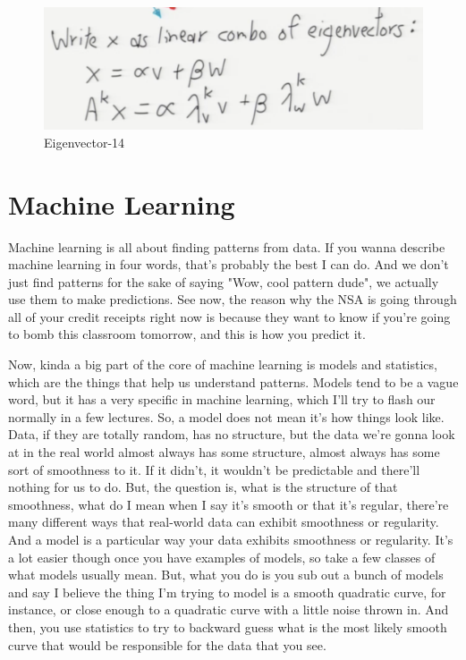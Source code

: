 \documentclass[fleqn,10pt]{olplainarticle}
\theoremstyle{definition}
\theoremstyle{remark}
\begin{document}
\begin{figure}[ht]
\centering
\includegraphics[width=1.0\linewidth]{images/chpt08-14}
\caption{Eigenvector-14}
\label{fig:chpt08-14}
\end{figure}



\clearpage
\section*{Machine Learning}
Machine learning is all about finding patterns from data. If you wanna describe machine learning in four words, that's probably the best I can do. And we don't just find patterns for the sake of saying "Wow, cool pattern dude", we actually use them to make predictions. See now, the reason why the NSA is going through all of your credit receipts right now is because they want to know if you're going to bomb this classroom tomorrow, and this is how you predict it. 

Now, kinda a big part of the core of machine learning is models and statistics, which are the things that help us understand patterns. Models tend to be a vague word, but it has a very specific in machine learning, which I'll try to flash our normally in a few lectures. So, a model does not mean it's how things look like. Data, if they are totally random, has no structure, but the data we're gonna look at in the real world almost always has some structure, almost always has some sort of smoothness to it. If it didn't, it wouldn't be predictable and there'll nothing for us to do. But, the question is, what is the structure of that smoothness, what do I mean when I say it's smooth or that it's regular, there're many different ways that real-world data can exhibit smoothness or regularity. And a model is a particular way your data exhibits smoothness or regularity. It's a lot easier though once you have examples of models, so take a few classes of what models usually mean. But, what you do is you sub out a bunch of models and say I believe the thing I'm trying to model is a smooth quadratic curve, for instance, or close enough to a quadratic curve with a little noise thrown in. And then, you use statistics to try to backward guess what is the most likely smooth curve that would be responsible for the data that you see. 
\end{document}

